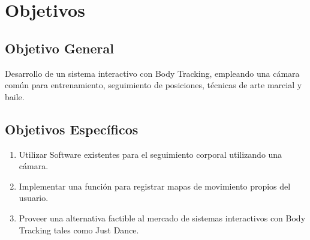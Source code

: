 \newpage
\section{Objetivos}


\subsection{Objetivo General}

Desarrollo de un sistema interactivo con Body Tracking, empleando una cámara común para entrenamiento, seguimiento de posiciones, técnicas de arte marcial y baile.
\subsection{Objetivos Específicos}

\begin{enumerate}
	\item Utilizar Software existentes para el seguimiento corporal utilizando una cámara.
	\item Implementar una función para registrar mapas de movimiento propios del usuario.
	\item Proveer una alternativa factible al mercado de sistemas interactivos con Body Tracking tales como Just Dance.
\end{enumerate}

